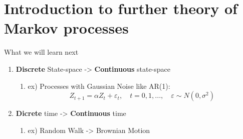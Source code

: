 \section{Introduction to further theory of Markov processes}
\begin{frame}{What we will learn next}
    \begin{enumerate}
        \item \textbf{Discrete} State-space -> \textbf{Continuous} state-space
        \begin{enumerate}
            \item ex) Processes with Gaussian Noise like AR(1):
            \[
            Z_{t+1} = \alpha Z_t + \varepsilon_t, 
            \quad t=0,1,...,\quad \varepsilon \sim N(0,\sigma^2)
            \]
        \end{enumerate}
        \item \textbf{Dicrete} time -> \textbf{Continuous} time
        \begin{enumerate}
            \item ex) Random Walk -> Brownian Motion
        \end{enumerate}
    \end{enumerate}
\end{frame}